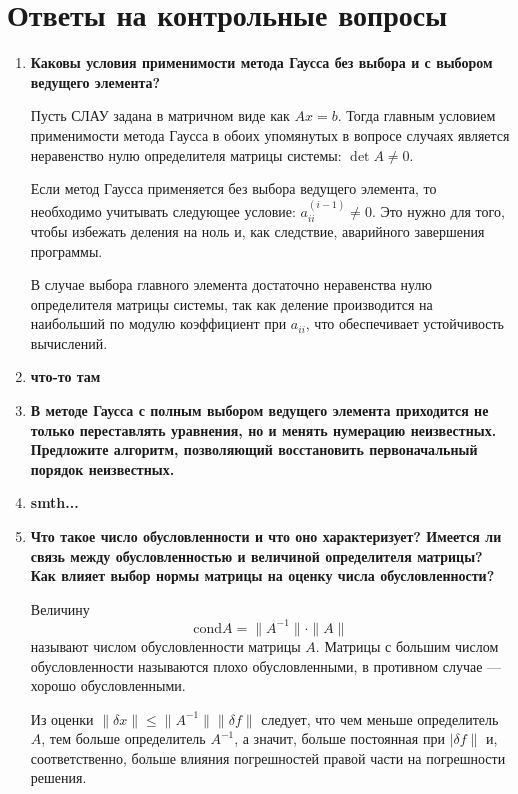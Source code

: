 \documentclass[12pt, a4paper]{article}
\begin{document}
	\section*{Ответы на контрольные вопросы}
	\begin{enumerate}
		\item \textbf{Каковы условия применимости метода Гаусса без выбора и с выбором ведущего элемента?}
		
		Пусть СЛАУ задана в матричном виде как $Ax=b$. Тогда главным условием применимости метода Гаусса в обоих упомянутых в вопросе случаях является неравенство нулю определителя матрицы системы: $\det A\neq0$.
		
		Если метод Гаусса применяется без выбора ведущего элемента, то необходимо учитывать следующее условие: $a_{ii}^{(i-1)}\neq0$. Это нужно для того, чтобы избежать деления на ноль и, как следствие, аварийного завершения программы.
		
		В случае выбора главного элемента достаточно неравенства нулю определителя матрицы системы, так как деление производится на наибольший по модулю коэффициент при $a_{ii}$, что обеспечивает устойчивость вычислений.
		
		\item \textbf{что-то там}
		
		\item\textbf{В методе Гаусса с полным выбором ведущего элемента
		приходится не только переставлять уравнения, но и менять нумерацию неизвестных. Предложите алгоритм, позволяющий восстановить первоначальный порядок неизвестных.}
		
		\item \textbf{smth...}
		
		\item \textbf{Что такое число обусловленности и что оно характеризует? Имеется ли связь между обусловленностью и величиной определителя матрицы? Как влияет выбор нормы матрицы на оценку числа обусловленности?}
		
		Величину
		$$
		\text{cond} A = \|A^{-1}\|\cdot\|A\|
		$$
		называют числом обусловленности матрицы $A$. Матрицы с большим числом обусловленности называются плохо обусловленными, в противном случае --- хорошо обусловленными.
		
		Из оценки $\|\delta x\|\leqslant\|A^{-1}\|\|\delta f\|$ следует, что чем меньше определитель $A$, тем больше определитель $A^{-1}$, а значит, больше постоянная при $|\delta f\|$ и, соответственно, больше влияния погрешностей правой части на погрешности решения.
	\end{enumerate}
	
\end{document}
